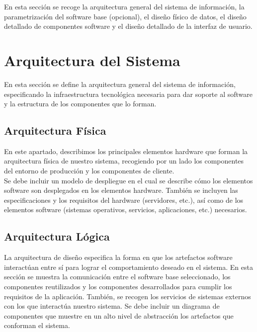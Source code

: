 

En esta sección se recoge la arquitectura general del sistema de información, la parametrización del software base (opcional), el diseño físico de datos, el diseño detallado de componentes software y el diseño detallado de la interfaz de usuario.

\section{Arquitectura del Sistema}
En esta sección se define la arquitectura general del sistema de información, especificando la infraestructura tecnológica necesaria para dar soporte al software y la estructura de los componentes que lo forman.

\subsection{Arquitectura Física}
En este apartado, describimos los principales elementos hardware que forman la arquitectura física de nuestro sistema, recogiendo por un lado los componentes del entorno de producción y los componentes de cliente.\\

Se debe incluir un modelo de despliegue en el cual se describe cómo los elementos software son desplegados en los elementos hardware. También se incluyen las especificaciones y los requisitos del hardware (servidores, etc.), así como de los elementos software (sistemas operativos, servicios, aplicaciones, etc.) necesarios.

\subsection{Arquitectura Lógica}
La arquitectura de diseño especifica la forma en que los artefactos software interactúan entre sí para lograr el comportamiento deseado en el sistema. En esta sección se muestra la comunicación entre el software base seleccionado, los componentes reutilizados y los componentes desarrollados para cumplir los requisitos de la aplicación. También, se recogen los servicios de sistemas externos con los que interactúa nuestro sistema.
Se debe incluir un diagrama de componentes que muestre en un alto nivel de abstracción los artefactos que conforman el sistema.\\

